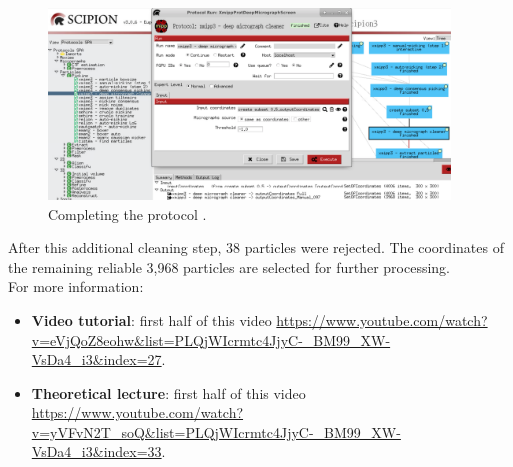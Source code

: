   \begin{figure}[H]
  \centering
  \captionsetup{width=.8\linewidth} 
  \includegraphics[width=0.95\textwidth]
  {images/5h_xmipp3_deepMicCleaner.pdf}
  \caption{Completing the protocol .}
  \label{fig:xmipp_deep_micrograph_cleaner}
  \end{figure}
  
  After this additional cleaning step, 38 particles were rejected. The coordinates of the remaining reliable 3,968 particles are selected for further processing.\\ 
  
  For more information: 
\begin{itemize}
   \item \textbf{Video tutorial}:  first half of this video \url{https://www.youtube.com/watch?v=eVjQoZ8eohw&list=PLQjWIcrmtc4JjyC-_BM99_XW-VsDa4_i3&index=27}.
   \item \textbf{Theoretical lecture}: first half of this video \url{https://www.youtube.com/watch?v=yVFvN2T_soQ&list=PLQjWIcrmtc4JjyC-_BM99_XW-VsDa4_i3&index=33}.
  \end{itemize}
  
